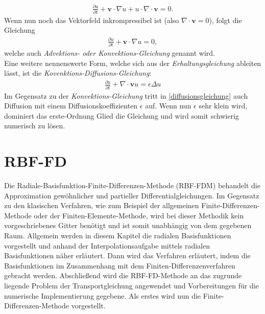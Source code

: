 \documentclass[12pt,titlepage]{article}
\begin{document}
\begin{align}
  \frac{\partial u}{\partial t}+\textbf{v}\cdot\nabla u + u \cdot \nabla \cdot\textbf{v}=0.\nonumber
\end{align}
Wenn nun noch das Vektorfeld inkrompressibel ist (also $\nabla \cdot \textbf{v}=0$), folgt die Gleichung
\begin{align}
 \frac{\partial u}{\partial t}+\textbf{v}\cdot\nabla u=0,\label{eq:transport3}
\end{align}
welche auch \textit{Advektions- oder Konvektions-Gleichung} genannt wird.\\
Eine weitere nennenswerte Form, welche sich aus der \textit{Erhaltungsgleichung} ableiten lässt, ist die \textit{Kovenktions-Diffusions-Gleichung}:
\begin{align}
 \frac{\partial u}{\partial t}+\nabla \cdot \textbf{v}u = \epsilon\Delta u\label{diffusionsgleichung}
\end{align}
Im Gegensatz zu der \textit{Konvektions-Gleichung} tritt in \eqref{diffusionsgleichung} auch Diffusion mit einem Diffusionskoeffizienten $\epsilon$ auf. Wenn nun $\epsilon$ sehr klein wird, dominiert das erste-Ordnung Glied die Gleichung und wird somit schwierig numerisch zu lösen.
\pagebreak
\section{RBF-FD}\label{sec:RBF-FD}
Die Radiale-Basisfunktion-Finite-Differenzen-Methode (RBF-FDM) behandelt die Approximation gewöhnlicher und partieller Differentialgleichungen. Im Gegensatz zu den klasischen Verfahren, wie zum Beispiel der allgemeinen Finite-Differenzen-Methode oder der Finiten-Elemente-Methode, wird bei dieser Methodik kein vorgeschriebenes Gitter benötigt und ist somit unabhängig von dem gegebenen Raum. Allgemein werden in diesem Kapitel die radialen Basisfunktionen vorgestellt und anhand der Interpolationsaufgabe mittels radialen Basisfunktionen näher erläutert. Dann wird das Verfahren erläutert, indem die Basisfunktionen im Zusammenhang mit dem Finiten-Differenzenverfahren gebracht werden. Abschließend wird die RBF-FD-Methode an das zugrunde liegende Problem der Transportgleichung angewendet und Vorbereitungen für die numerische Implementierung gegebene. Als erstes wird nun die Finite-Differenzen-Methode vorgestellt.
\end{document}
